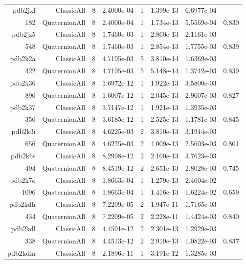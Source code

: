 \begin{xltabular}{\textwidth}{r|rcS[table-format=1.4e+2]cS[table-format=1.3e+2]S[table-format=1.4e+2]S[table-format=-1.3]}
pdb2jxf & ClassicAll & 8 & 2.4000e-04 & 1 & 1.399e-13 & 6.6977e-04 & \\
182 & QuaternionAll & 8 & 2.4000e-04 & 1 & 1.734e-13 & 5.5569e-04 & 0.830\\  \addlinespace
pdb2jz5 & ClassicAll & 8 & 1.7460e-03 & 1 & 2.860e-13 & 2.1161e-03 & \\
548 & QuaternionAll & 8 & 1.7460e-03 & 1 & 2.854e-13 & 1.7755e-03 & 0.839\\  \addlinespace
pdb2k2a & ClassicAll & 8 & 4.7195e-03 & 5 & 3.810e-14 & 1.6369e-03 & \\
422 & QuaternionAll & 8 & 4.7195e-03 & 5 & 5.148e-14 & 1.3742e-03 & 0.839\\  \addlinespace
pdb2k36 & ClassicAll & 8 & 1.6972e-12 & 1 & 1.922e-13 & 3.5800e-03 & \\
896 & QuaternionAll & 8 & 1.6007e-12 & 1 & 2.045e-13 & 2.9607e-03 & 0.827\\  \addlinespace
pdb2k37 & ClassicAll & 8 & 3.7147e-12 & 1 & 1.921e-13 & 1.3935e-03 & \\
356 & QuaternionAll & 8 & 3.6185e-12 & 1 & 2.525e-13 & 1.1781e-03 & 0.845\\  \addlinespace
pdb2k3i & ClassicAll & 8 & 4.6225e-03 & 2 & 3.810e-13 & 3.1944e-03 & \\
656 & QuaternionAll & 8 & 4.6225e-03 & 2 & 4.009e-13 & 2.5603e-03 & 0.801\\  \addlinespace
pdb2k6s & ClassicAll & 8 & 8.2998e-12 & 2 & 2.100e-13 & 3.7623e-03 & \\
494 & QuaternionAll & 8 & 8.4519e-12 & 2 & 2.651e-13 & 2.8028e-03 & 0.745\\  \addlinespace
pdb2k7o & ClassicAll & 8 & 1.8663e-04 & 1 & 1.279e-13 & 2.4604e-02 & \\
1096 & QuaternionAll & 8 & 1.8663e-04 & 1 & 1.416e-13 & 1.6224e-02 & 0.659\\  \addlinespace
pdb2kdh & ClassicAll & 8 & 7.2209e-05 & 2 & 1.947e-11 & 1.7165e-03 & \\
434 & QuaternionAll & 8 & 7.2209e-05 & 2 & 2.228e-11 & 1.4424e-03 & 0.840\\  \addlinespace
pdb2kdl & ClassicAll & 8 & 4.4591e-12 & 2 & 2.301e-13 & 1.2929e-03 & \\
338 & QuaternionAll & 8 & 4.4513e-12 & 2 & 2.919e-13 & 1.0822e-03 & 0.837\\  \addlinespace
pdb2kdm & ClassicAll & 8 & 2.1896e-11 & 1 & 3.191e-12 & 1.3285e-03 & \\

\end{xltabular}
